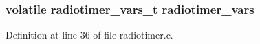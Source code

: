 \subsubsection[{\texorpdfstring{radiotimer\+\_\+vars}{radiotimer_vars}}]{\setlength{\rightskip}{0pt plus 5cm}volatile {\bf radiotimer\+\_\+vars\+\_\+t} radiotimer\+\_\+vars}\hypertarget{iot-lab___a8-_m3_2radiotimer_8c_adedbe6745fb701ef34c3e73605a6e343}{}\label{iot-lab___a8-_m3_2radiotimer_8c_adedbe6745fb701ef34c3e73605a6e343}


Definition at line 36 of file radiotimer.\+c.

